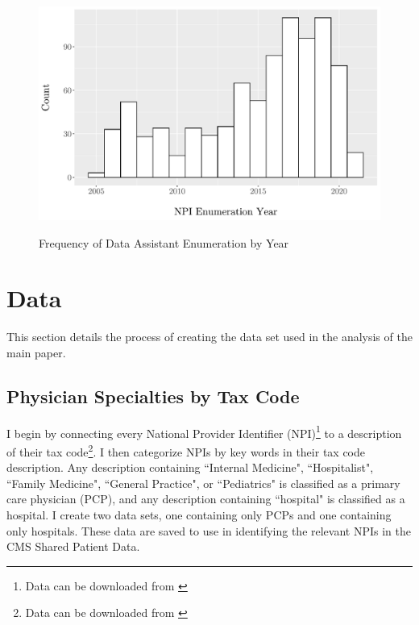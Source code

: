 \documentclass[11pt]{article}
\begin{document}
\begin{figure}[p]
\centering
\caption{Frequency of Data Assistant Enumeration by Year}
\includegraphics[scale=.5]{Objects/dataassistant_histogram.pdf}
\label{fig:dataassistant_histogram}
\end{figure}

\clearpage

\renewcommand*{\bibfont}{\footnotesize}

\printbibliography

\clearpage


\appendix

\section{Data}\label{app:data}

This section details the process of creating the data set used in the analysis of the main paper. 

\subsection{Physician Specialties by Tax Code}\label{sec:taxcode}

I begin by connecting every National Provider Identifier (NPI)\footnote{Data can be downloaded from \hyperlink{https://download.cms.gov/nppes/NPI/Files.html}{}} to a description of their tax code\footnote{Data can be downloaded from \hyperlink{https://nucc.org/index.php/code-sets-mainmenu-41/provider-taxonomy-mainmenu-40/pdf-mainmenu-53}{}}. I then categorize NPIs by key words in their tax code description. Any description containing ``Internal Medicine", ``Hospitalist", ``Family Medicine", ``General Practice", or ``Pediatrics" is classified as a primary care physician (PCP), and any description containing ``hospital" is classified as a hospital. I create two data sets, one containing only PCPs and one containing only hospitals. These data are saved to use in identifying the relevant NPIs in the CMS Shared Patient Data. 
\end{document}
